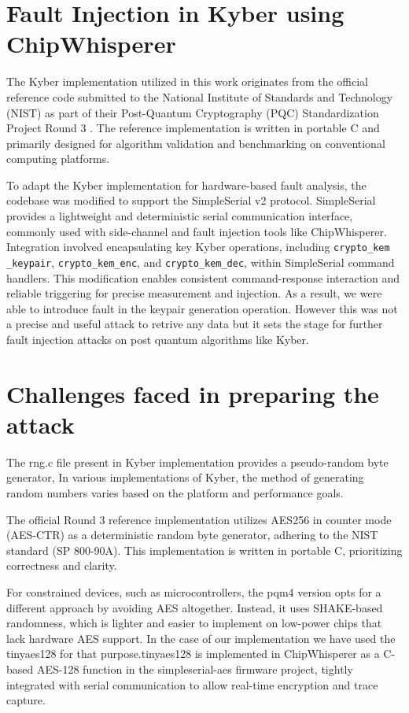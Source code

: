 \section{Fault Injection in Kyber using ChipWhisperer}
The Kyber implementation utilized in this work originates from the official reference code submitted to the National Institute of Standards and Technology (NIST) as part of their Post-Quantum Cryptography (PQC) Standardization Project Round 3 \cite{nistpqc2020}. The reference implementation is written in portable C and primarily designed for algorithm validation and benchmarking on conventional computing platforms.

To adapt the Kyber implementation for hardware-based fault analysis, the codebase was modified to support the SimpleSerial v2 protocol. SimpleSerial provides a lightweight and deterministic serial communication interface, commonly used with side-channel and fault injection tools like ChipWhisperer. Integration involved encapsulating key Kyber operations, including \texttt{crypto\_kem
\_keypair}, \texttt{crypto\_kem\_enc}, and \texttt{crypto\_kem\_dec}, within SimpleSerial command handlers. This modification enables consistent command-response interaction and reliable triggering for precise measurement and injection. As a result, we were able to introduce fault in the keypair generation operation. However this was not a precise and useful attack to retrive any data but it sets the stage for further fault injection attacks on post quantum algorithms like Kyber.

\section{Challenges faced in preparing the attack}
The rng.c file present in Kyber implementation provides a pseudo-random byte generator,
In various implementations of Kyber, the method of generating random numbers varies based on the platform and performance goals. 

The official Round 3 reference implementation utilizes AES256 in counter mode (AES-CTR) as a deterministic random byte generator, adhering to the NIST standard (SP 800-90A). This implementation is written in portable C, prioritizing correctness and clarity.

For constrained devices, such as microcontrollers, the pqm4 version opts for a different approach by avoiding AES altogether. Instead, it uses SHAKE-based randomness, which is lighter and easier to implement on low-power chips that lack hardware AES support.
In the case of our implementation we have used the tinyaes128 for that purpose.tinyaes128 is implemented in ChipWhisperer as a C-based AES-128 function in the simpleserial-aes firmware project, tightly integrated with serial communication to allow real-time encryption and trace capture.


